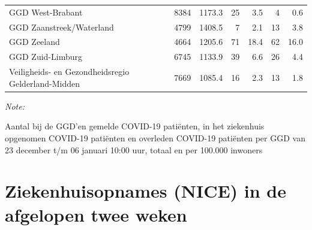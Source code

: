 \documentclass[
  english,
  man,floatsintext]{apa6}
\begin{document}
\begin{table}
\begin{threeparttable}
\begin{tabular}{lrrrrrr}
GGD West-Brabant & 8384 & 1173.3 & 25 & 3.5 & 4 & 0.6\\
GGD Zaanstreek/Waterland & 4799 & 1408.5 & 7 & 2.1 & 13 & 3.8\\
GGD Zeeland & 4664 & 1205.6 & 71 & 18.4 & 62 & 16.0\\
GGD Zuid-Limburg & 6745 & 1133.9 & 39 & 6.6 & 26 & 4.4\\
Veiligheids- en Gezondheidsregio Gelderland-Midden & 7669 & 1085.4 & 16 & 2.3 & 13 & 1.8\\
\bottomrule
\end{tabular}
\begin{tablenotes}
\item \textit{Note: } 
\item Aantal bij de GGD’en gemelde COVID-19 patiënten, in het ziekenhuis opgenomen COVID-19 patiënten en overleden COVID-19 patiënten per GGD van 23 december t/m 06 januari 10:00 uur, totaal en per 100.000 inwoners
\end{tablenotes}
\end{threeparttable}
\endgroup{}
\end{table}

\newpage

\hypertarget{ziekenhuisopnames-nice-in-de-afgelopen-twee-weken}{%
\section{Ziekenhuisopnames (NICE) in de afgelopen twee weken}\label{ziekenhuisopnames-nice-in-de-afgelopen-twee-weken}}
\end{document}
